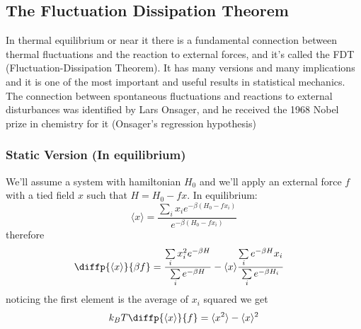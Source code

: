 \subsection{The Fluctuation Dissipation Theorem}
In thermal equilibrium or near it there is a fundamental connection between thermal fluctuations and the reaction to external forces, and it's called the FDT (Fluctuation-Dissipation Theorem). It has many versions and many implications and it is one of the most important and useful results in statistical mechanics. The connection between spontaneous fluctuations and reactions to external disturbances was identified by Lars Onsager, and he received the 1968 Nobel prize in chemistry for it (Onsager's regression hypothesis)
\subsubsection{Static Version (In equilibrium)}
We'll assume a system with hamiltonian \(H_0\) and we'll apply an external force \(f\) with a tied field \(x\) such that \(H=H_0-fx\). In equilibrium:
\begin{equation}
	\langle x \rangle = \frac{\sum\limits_i x_i e^{-\beta(H_0-fx_i)}}{e^{-\beta (H_0-fx_i)}}
\end{equation}
therefore
\begin{align}
	\diffp{\langle x \rangle}{\beta f} &= \frac{\sum\limits_i x_i^2 e^{-\beta H}}{\sum\limits_i e^{-\beta H}} - \langle x \rangle \frac{\sum\limits_i e^{-\beta H} x_i}{\sum\limits_i e^{-\beta H_i}}
\end{align}
noticing the first element is the average of \(x_i\) squared we get
\begin{equation}
	k_B T\diffp{\langle x \rangle}{f} = \langle x^2\rangle - \langle x \rangle^2
\end{equation}
